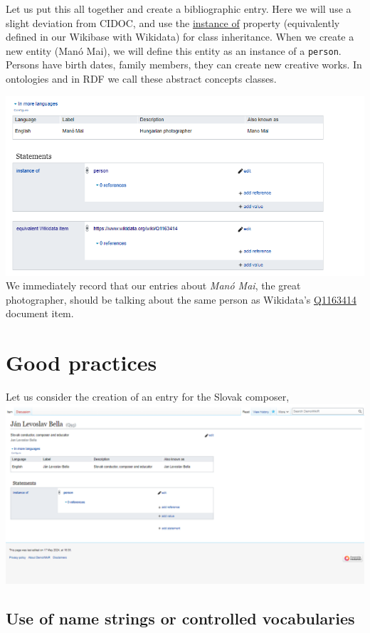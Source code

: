 \documentclass[
  letterpaper,
  DIV=11,
  numbers=noendperiod]{scrreprt}
\begin{document}
Let us put this all together and create a bibliographic entry. Here we
will use a slight deviation from CIDOC, and use the
\href{https://www.wikidata.org/wiki/Property:P31}{instance of} property
(equivalently defined in our Wikibase with Wikidata) for class
inheritance. When we create a new entity (Manó Mai), we will define this
entity as an instance of a \texttt{person}. Persons have birth dates,
family members, they can create new creative works. In ontologies and in
RDF we call these abstract concepts classes.

\includegraphics{png/wikibase/edit/create_new_item_mano-mai.png} We
immediately record that our entries about \emph{Manó Mai}, the great
photographer, should be talking about the same person as Wikidata's
\href{https://www.wikidata.org/wiki/Q1163414}{Q1163414} document item.

\section{Good practices}\label{good-practices}

Let us consider the creation of an entry for the Slovak composer,
\includegraphics{png/wikibase/edit/bella/bella_1.png}

\subsection{Use of name strings or controlled
vocabularies}\label{use-of-name-strings-or-controlled-vocabularies}
\end{document}
